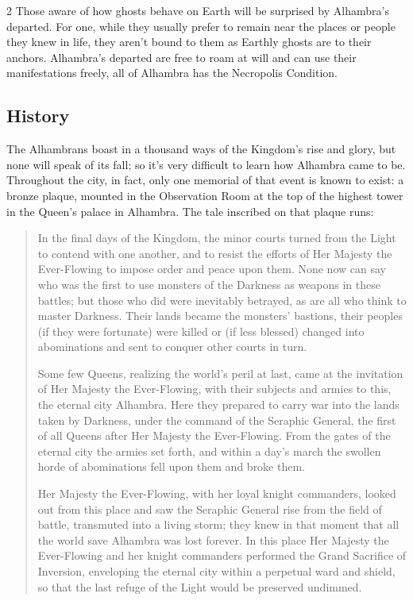 \begin{multicols}{2}
Those aware of how ghosts behave on Earth will be surprised by Alhambra's departed. For one, while they usually prefer to remain near the places or people they knew in life, they aren't bound to them as Earthly ghosts are to their anchors. Alhambra's departed are free to roam at will and can use their manifestations freely, all of Alhambra has the Necropolis Condition. 

\subsection*{History}

The Alhambrans boast in a thousand ways of the Kingdom's rise and glory, but none will speak of its fall; so it's very difficult to learn how Alhambra came to be.  Throughout the city, in fact, only one memorial of that event is known to exist: a bronze plaque, mounted in the Observation Room at the top of the highest tower in the Queen's palace in Alhambra.  The tale inscribed on that plaque runs:

    \begin{quotation}
     
    In the final days of the Kingdom, the minor courts turned from the Light to contend with one another, and to resist the efforts of Her Majesty the Ever-Flowing to impose order and peace upon them. None now can say who was the first to use monsters of the Darkness as weapons in these battles; but those who did were inevitably betrayed, as are all who think to master Darkness. Their lands became the monsters' bastions, their peoples (if they were fortunate) were killed or (if less blessed) changed into abominations and sent to conquer other courts in turn. 
    
    Some few Queens, realizing the world's peril at last, came at the invitation of Her Majesty the Ever-Flowing, with their subjects and armies to this, the eternal city Alhambra. Here they prepared to carry war into the lands taken by Darkness, under the command of the Seraphic General, the first of all Queens after Her Majesty the Ever-Flowing. From the gates of the eternal city the armies set forth, and within a day's march the swollen horde of abominations fell upon them and broke them. 
    
    Her Majesty the Ever-Flowing, with her loyal knight commanders, looked out from this place and saw the Seraphic General rise from the field of battle, transmuted into a living storm; they knew in that moment that all the world save Alhambra was lost forever. In this place Her Majesty the Ever-Flowing and her knight commanders performed the Grand Sacrifice of Inversion, enveloping the eternal city within a perpetual ward and shield, so that the last refuge of the Light would be preserved undimmed. 
    

\end{quotation}
\end{multicols}
